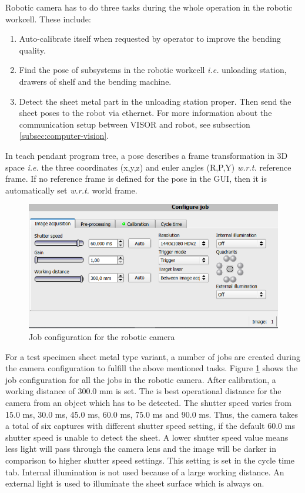 Robotic camera has to do three tasks during the whole operation in the robotic workcell. These include:
\begin{enumerate}
    \item Auto-calibrate itself when requested by operator to improve the bending quality.
    \item Find the pose of subsystems in the robotic workcell \textit{i.e.} unloading station, drawers of shelf and the bending machine.
    \item Detect the sheet metal part in the unloading station proper. Then send the sheet poses to the robot via ethernet. For more information about the communication setup between VISOR and robot, see subsection \ref{subsec:computer-vision}.
\end{enumerate}



In teach pendant program tree, a pose describes a frame transformation in 3D space \textit{i.e.} the three coordinates (x,y,z) and euler angles (R,P,Y) \textit{w.r.t.} reference frame. If no reference frame is defined for the pose in the GUI, then it is automatically set \textit{w.r.t.} world frame.

\begin{figure}[h]
    \centering
    \includegraphics[width=\textwidth]{figures/job-configuration.png}
    \caption{Job configuration for the robotic camera}
    \label{fig:job-configuration-robotic}
\end{figure}

For a test specimen sheet metal type variant, a number of jobs are created during the camera configuration to fulfill the above mentioned tasks.
Figure \ref{fig:job-configuration-robotic} shows the job configuration for all the jobs in the robotic camera.
After calibration, a working distance of 300.0 mm is set. The is best operational distance for the camera from an object which has to be detected. The shutter speed varies from 15.0 ms, 30.0 ms, 45.0 ms, 60.0 ms, 75.0 ms and 90.0 ms. Thus, the camera takes a total of six captures with different shutter speed setting, if the default 60.0 ms shutter speed is unable to detect the sheet. A lower shutter speed value means less light will pass through the camera lens and the image will be darker in comparison to higher shutter speed settings. This setting is set in the cycle time tab.
Internal illumination is not used because of a large working distance. An external light is used to illuminate the sheet surface which is always on.


